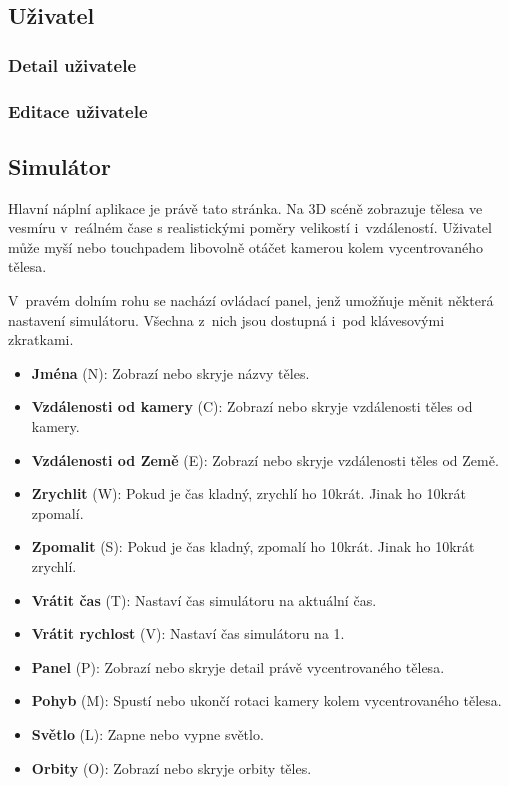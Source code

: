 \documentclass[a4paper,12pt]{article}
\begin{document}
\subsection{Uživatel}

\subsubsection{Detail uživatele}

\subsubsection{Editace uživatele}
	
\subsection{Simulátor}

Hlavní náplní aplikace je právě tato stránka. Na 3D scéně zobrazuje tělesa ve vesmíru v~reálném čase s realistickými poměry velikostí i~vzdáleností. Uživatel může myší nebo touchpadem libovolně otáčet kamerou kolem vycentrovaného tělesa.

V~pravém dolním rohu se nachází ovládací panel, jenž umožňuje měnit některá nastavení simulátoru. Všechna z~nich jsou dostupná i~pod klávesovými zkratkami.

\begin{itemize}
\item \textbf{Jména} (N): Zobrazí nebo skryje názvy těles.
\item \textbf{Vzdálenosti od kamery} (C): Zobrazí nebo skryje vzdálenosti těles od kamery.
\item \textbf{Vzdálenosti od Země} (E): Zobrazí nebo skryje vzdálenosti těles od Země.
\item \textbf{Zrychlit} (W): Pokud je čas kladný, zrychlí ho 10krát. Jinak ho 10krát zpomalí.
\item \textbf{Zpomalit} (S): Pokud je čas kladný, zpomalí ho 10krát. Jinak ho 10krát zrychlí.
\item \textbf{Vrátit čas} (T): Nastaví čas simulátoru na aktuální čas.
\item \textbf{Vrátit rychlost} (V): Nastaví čas simulátoru na 1.
\item \textbf{Panel} (P): Zobrazí nebo skryje detail právě vycentrovaného tělesa.
\item \textbf{Pohyb} (M): Spustí nebo ukončí rotaci kamery kolem vycentrovaného tělesa.
\item \textbf{Světlo} (L): Zapne nebo vypne světlo.
\item \textbf{Orbity} (O): Zobrazí nebo skryje orbity těles.
\end{itemize}
\end{document}
